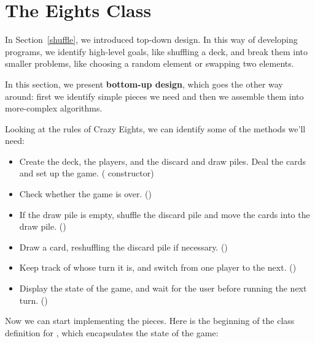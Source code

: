 \section{The Eights Class}
\label{extending-classes_eights-class}


In Section~\ref{shuffle}, we introduced top-down design. In this way of developing programs, we identify high-level goals, like shuffling a deck, and break them into smaller problems, like choosing a random element or swapping two elements.


In this section, we present {\bf bottom-up design}, which goes the other way around: first we identify simple pieces we need and then we assemble them into more-complex algorithms.

Looking at the rules of Crazy Eights, we can identify some of the methods we'll need:

\begin{itemize}

\item Create the deck, the players, and the discard and draw piles. Deal the cards and set up the game. ( constructor)

\item Check whether the game is over. ()

\item If the draw pile is empty, shuffle the discard pile and move the cards into the draw pile. ()

\item Draw a card, reshuffling the discard pile if necessary. ()

\item Keep track of whose turn it is, and switch from one player to the next. ()

\item Display the state of the game, and wait for the user before running the next turn. ()

\end{itemize}

Now we can start implementing the pieces.
Here is the beginning of the class definition for , which encapsulates the state of the game:


\begin{code}
public class Eights {

    private Player one;
    private Player two;
    private Hand drawPile;
    private Hand discardPile;
    private Scanner in;
\end{code}

